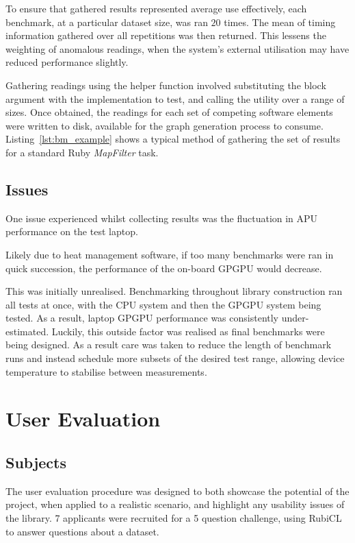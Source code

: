 To ensure that gathered results represented average use effectively, each benchmark, at a particular dataset size,  was ran $20$ times. The mean of timing information gathered over all repetitions was then returned. This lessens the weighting of anomalous readings, when the system's external utilisation may have reduced performance slightly.


Gathering readings using the helper function involved substituting the block argument with the implementation to test, and calling the utility over a range of sizes.
Once obtained, the readings for each set of competing software elements were written to disk, available for the graph generation process to consume.
Listing~\ref{lst:bm_example} shows a typical method of gathering the set of results for a standard Ruby \emph{MapFilter} task.


\subsection{Issues}
One issue experienced whilst collecting results was the fluctuation in \ac{APU} performance on the test laptop.

Likely due to heat management software, if too many benchmarks were ran in quick succession, the performance of the on-board \ac{GPGPU} would decrease.

This was initially unrealised. Benchmarking throughout library construction ran all tests at once, with the \ac{CPU} system and then the \ac{GPGPU} system being tested. As a result, laptop \ac{GPGPU} performance was consistently under-estimated. Luckily, this outside factor was realised as final benchmarks were being designed. As a result care was taken to reduce the length of benchmark runs and instead schedule more subsets of the desired test range, allowing device temperature to stabilise between measurements.

\section{User Evaluation}
\subsection{Subjects}
The user evaluation procedure was designed to both showcase the potential of the project, when applied to a realistic scenario, and highlight any usability issues of the library.
7 applicants were recruited for a 5 question challenge, using RubiCL to answer questions about a dataset.


